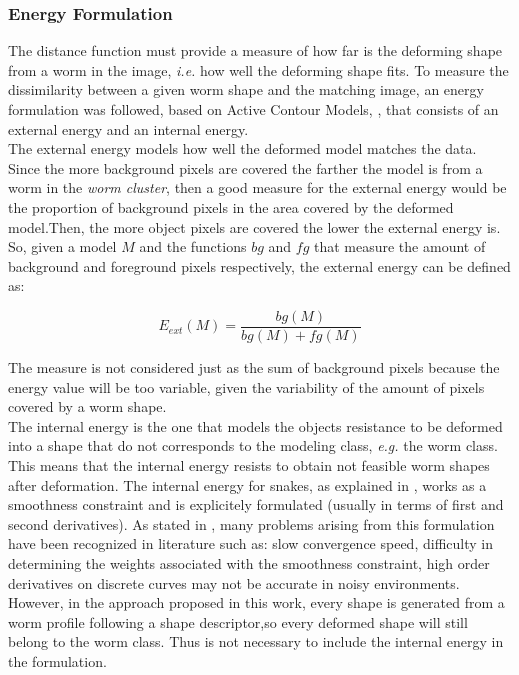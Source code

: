 \subsubsection*{Energy Formulation}
 
The distance function must provide a measure of how far is the deforming shape from a worm in the image, 
\emph{i.e.} how well
the deforming shape fits. To measure the dissimilarity between a given worm shape and the
matching image, an energy formulation was followed, based on Active Contour Models,
\cite{snakes}, that consists of an external energy and an internal energy.\\

The external energy models how well the deformed model matches the data. Since the more
background pixels are covered the farther the model is from a worm in the \emph{worm cluster}, 
then a good measure for the external energy would be the proportion of background pixels in the 
area covered by the deformed model.Then, the more object pixels are covered the lower the 
external energy is. So, given a model $M$ and the functions $bg$ and $fg$  that measure
the amount of background and foreground pixels respectively, the external energy
can be defined as:

$$E_{ext}(M) = \frac{bg(M)}{bg(M)+fg(M)}$$

The measure is not considered just as the sum of background pixels
because the energy value will be too variable, given the variability of the amount
of pixels covered by a worm shape.\\

The internal energy is the one that models the objects resistance to be deformed into
a shape that do not corresponds to the modeling class, \emph{e.g.} the worm class. 
This means that the internal energy resists to obtain not feasible worm
shapes after deformation. The internal energy for
snakes, as explained in \cite{snakes}, works as a smoothness constraint and is explicitely
formulated (usually in terms of first and second derivatives). As stated in \cite{bspline}, 
many problems arising from this formulation have been recognized in literature such as:
slow convergence speed, difficulty in determining the weights associated with the 
smoothness constraint, high order derivatives on discrete curves may not be accurate
in noisy environments.\\
However, in the approach proposed in this work, every shape is generated from a worm 
profile following a shape descriptor,so every deformed shape will still belong to the 
worm class. Thus is not necessary to include the internal energy in the 
formulation.

